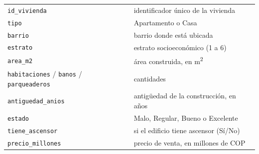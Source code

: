 \documentclass[11pt]{article}
\begin{document}
\vspace{4pt}
\begin{regla}
\small
\begin{tabular}{@{}ll@{}}
  \texttt{id\_vivienda} & identificador único de la vivienda \\
  \texttt{tipo} & Apartamento o Casa \\
  \texttt{barrio} & barrio donde está ubicada \\
  \texttt{estrato} & estrato socioeconómico (1 a 6) \\
  \texttt{area\_m2} & área construida, en m\textsuperscript{2} \\
  \texttt{habitaciones} / \texttt{banos} / \texttt{parqueaderos} & cantidades \\
  \texttt{antiguedad\_anios} & antigüedad de la construcción, en años \\
  \texttt{estado} & Malo, Regular, Bueno o Excelente \\
  \texttt{tiene\_ascensor} & si el edificio tiene ascensor (Sí/No) \\
  \texttt{precio\_millones} & precio de venta, en millones de COP \\
\end{tabular}
\end{regla}
\end{document}
